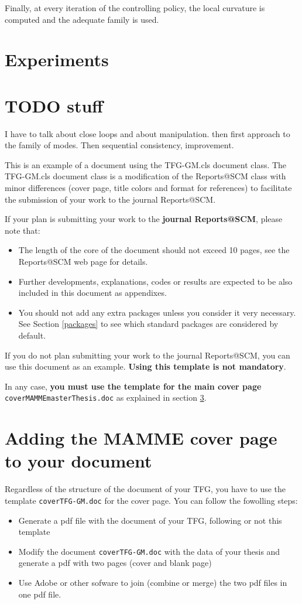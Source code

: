 \documentclass[12,twoside]{TFG-GM}
\theoremstyle{definition}
\theoremstyle{remark}
\begin{document}
Finally, at every iteration of the controlling policy, the local curvature is computed and the adequate family is used.

\section{Experiments}
\label{sec:experiments}

\section{TODO stuff}
I have to talk about close loops and about manipulation. then first approach to the family of modes. Then sequential consistency, improvement.

This is an example of a document using the TFG-GM.cls document class. The TFG-GM.cls document class is a modification of the Reports@SCM class with minor differences (cover page, title colors and format for references) to facilitate the submission of your work to the journal Reports@SCM.

If your plan is submitting your work to the \textbf{journal Reports@SCM}, please note that:
\begin{itemize}
	\item The length of the core of the document should not exceed 10 pages, see the Reports@SCM web page for details.
	\item Further developments, explanations, codes or results are expected to be also included in this document as appendixes.
	\item You should not add any extra packages unless you consider it very necessary. See Section \ref{packages} to see which standard packages  are considered by default. 
\end{itemize} 

If you do not plan submitting your work to the journal  Reports@SCM, you can use this document as an example. \textbf{Using this template is not mandatory}.
 
In any case, \textbf{you must use the template for the main cover page} \texttt{coverMAMMEmasterThesis.doc} as explained in section \ref{sec:coverPage}.


\section{Adding the MAMME cover page to your document}
\label{sec:coverPage}
  
Regardless of the structure of the document of your TFG, you have to use the template \texttt{coverTFG-GM.doc} for the cover page. You can follow the fowolling steps:
\begin{itemize}
	\item Generate a pdf file with the document of your TFG, following or not this template
	\item Modify the document \texttt{coverTFG-GM.doc} with the data of your thesis and generate a pdf with two pages (cover and blank page)
	\item Use Adobe or other sofware to join (combine or merge) the two pdf files in one pdf file. 
\end{itemize}
 
\end{document}
